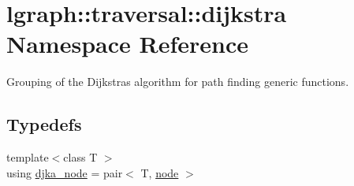 \hypertarget{namespacelgraph_1_1traversal_1_1dijkstra}{}\section{lgraph\+:\+:traversal\+:\+:dijkstra Namespace Reference}
\label{namespacelgraph_1_1traversal_1_1dijkstra}


Grouping of the Dijkstra\textquotesingle{}s algorithm for path finding generic functions.  


\subsection*{Typedefs}
\begin{DoxyCompactItemize}
\item 
{\footnotesize template$<$class T $>$ }\\using \hyperlink{namespacelgraph_1_1traversal_1_1dijkstra_a06495bda19735564a02a6e98198a0980}{djka\+\_\+node} = pair$<$ T, \hyperlink{namespacelgraph_1_1utils_ab9c6b34241f0b68372c55f34c460e863}{node} $>$\hypertarget{namespacelgraph_1_1traversal_1_1dijkstra_a06495bda19735564a02a6e98198a0980}{}\label{namespacelgraph_1_1traversal_1_1dijkstra_a06495bda19735564a02a6e98198a0980}


\end{DoxyCompactItemize}
